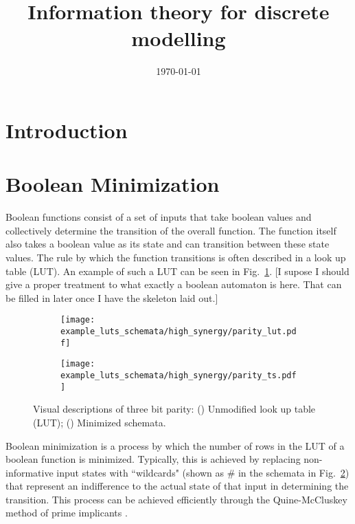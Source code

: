 \documentclass[12pt]{article} %
\newcommand{\figref}[1]{Fig.~\ref{fig:#1}}
\begin{document}

\title{Information theory for discrete modelling} %
\date{\today}
\maketitle %

\section{Introduction}\label{sec:introduction} %


\section{Boolean Minimization}\label{sec:boolmin} %

Boolean functions consist of a set of inputs that take boolean values and 
collectively determine the transition of the overall function. The function 
itself also takes a boolean value as its state and can transition between these
state values. The rule by which the function transitions is often described in a
look up table (LUT). An example of such a LUT can be seen in 
\figref{parity_lut}. [I supose I should give a proper treatment to what exactly
a boolean automaton is here. That can be filled in later once I have the 
skeleton laid out.]

\begin{figure}[h]
    \centering
    \begin{subfigure}[A]{0.48\textwidth}
        \centering
        \texttt{[image: example\_luts\_schemata/high\_synergy/parity\_lut.pdf]}
        \label{fig:parity_lut}
        \caption{\label{fig:parity_lut}}
    \end{subfigure}
    \begin{subfigure}[B]{0.48\textwidth}
        \centering
        \texttt{[image: example\_luts\_schemata/high\_synergy/parity\_ts.pdf]}
        \label{fig:parity_ts}
        \caption{\label{fig:parity_ts}}
    \end{subfigure}
    \caption{Visual descriptions of three bit parity: 
    () Unmodified look up table (LUT);
    () Minimized schemata.}
    \label{fig:parity}
\end{figure}

Boolean minimization is a process by which the number of rows in the LUT of a
boolean function is minimized. Typically, this is achieved by replacing 
non-informative input states with ``wildcards" (shown as \# in the schemata in
\figref{parity_ts}) that represent an indifference to the actual state of that 
input in determining the transition. This process can be achieved efficiently
through the Quine-McCluskey method of prime implicants \cite{quine_way_1955}.
\end{document}
